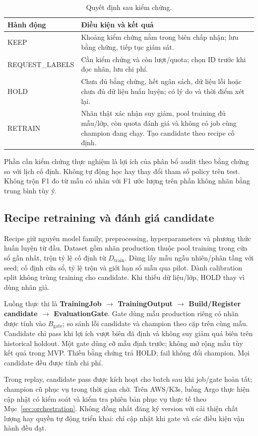 \begin{table}[ht]
\centering
\caption{Quyết định sau kiểm chứng.}\label{tab:policy}
\begin{tabularx}{\linewidth}{@{}L{3.5cm} Y@{}}
\toprule\textbf{Hành động} & \textbf{Điều kiện và kết quả} \\
\midrule
KEEP & Khoảng kiểm chứng nằm trong biên chấp nhận; lưu bằng chứng, tiếp tục giám sát. \\
REQUEST\_LABELS & Cần kiểm chứng và còn lượt/quota; chọn ID trước khi đọc nhãn, lưu chi phí. \\
HOLD & Chưa đủ bằng chứng, hết ngân sách, dữ liệu lỗi hoặc chưa đủ dữ liệu huấn luyện; có lý do và thời điểm xét lại. \\
RETRAIN & Nhãn thật xác nhận suy giảm, pool training đủ mẫu/lớp, còn quota đánh giá và không có job cùng champion đang chạy. Tạo candidate theo recipe cố định. \\
\bottomrule
\end{tabularx}
\end{table}
Phần cần kiểm chứng thực nghiệm là lợi ích của phân bổ audit theo bằng chứng so với lịch cố định. Không tự động học hay thay đổi tham số policy trên test. Không trộn F1 đo từ mẫu có nhãn với F1 ước lượng trên phần không nhãn bằng trung bình tùy ý.

\subsection{Recipe retraining và đánh giá candidate}
Recipe giữ nguyên model family, preprocessing, hyperparameters và phương thức huấn luyện từ đầu. Dataset gồm nhãn production thuộc pool training trong cửa sổ gần nhất, trộn tỷ lệ cố định từ $D_{\mathrm{train}}$. Dùng lấy mẫu ngẫu nhiên/phân tầng với seed; cố định cửa sổ, tỷ lệ trộn và giới hạn số mẫu qua pilot. Dành calibration split không trùng training cho candidate. Khi thiếu dữ liệu/lớp, HOLD thay vì dùng nhãn giả.

Luồng thực thi là \textbf{TrainingJob $\rightarrow$ TrainingOutput $\rightarrow$ Build/Register candidate $\rightarrow$ EvaluationGate}. Gate dùng mẫu production riêng có nhãn được tính vào $B_{\mathrm{gate}}$; so sánh lỗi candidate và champion theo cặp trên cùng mẫu. Candidate chỉ pass khi lợi ích vượt biên đã định và không suy giảm quá biên trên historical holdout. Một gate dùng cỡ mẫu định trước; không mở rộng mẫu tùy kết quả trong MVP. Thiếu bằng chứng trả HOLD; fail không đổi champion. Mọi candidate đều được tính chi phí.

Trong replay, candidate pass được kích hoạt cho batch sau khi job/gate hoàn tất; champion cũ phục vụ trong thời gian chờ. Trên AWS/K3s, luồng Argo thực hiện cập nhật có kiểm soát và kiểm tra phiên bản phục vụ thực tế theo Mục~\ref{sec:orchestration}. Không đồng nhất đăng ký version với cải thiện chất lượng hay quyền tự động triển khai: chỉ cập nhật khi gate và các điều kiện vận hành đều đạt.

